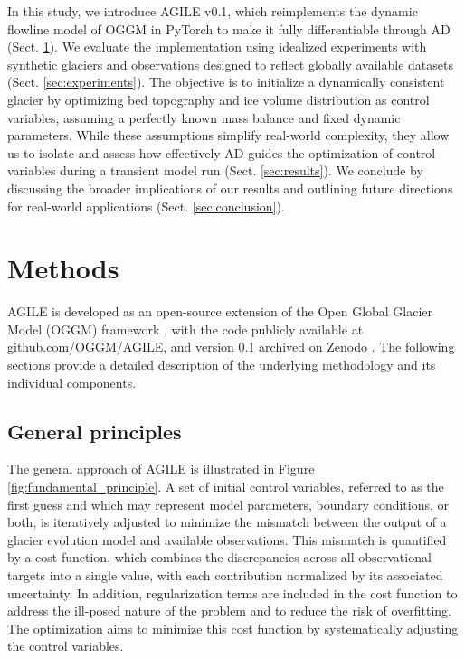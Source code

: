 \documentclass[journal abbreviation, manuscript]{copernicus}
\begin{document}
In this study, we introduce AGILE v0.1, which reimplements the dynamic flowline model of OGGM in PyTorch to make it fully differentiable through AD (Sect. \ref{sec:methods}). We evaluate the implementation using idealized experiments with synthetic glaciers and observations designed to reflect globally available datasets (Sect. \ref{sec:experiments}). The objective is to initialize a dynamically consistent glacier by optimizing bed topography and ice volume distribution as control variables, assuming a perfectly known mass balance and fixed dynamic parameters. While these assumptions simplify real-world complexity, they allow us to isolate and assess how effectively AD guides the optimization of control variables during a transient model run (Sect. \ref{sec:results}). We conclude by discussing the broader implications of our results and outlining future directions for real-world applications (Sect. \ref{sec:conclusion}).


\section{Methods}
\label{sec:methods}

AGILE is developed as an open-source extension of the Open Global Glacier Model (OGGM) framework \citep{Maussion2019}, with the code publicly available at \href{https://github.com/OGGM/AGILE}{github.com/OGGM/AGILE}, and version 0.1 archived on Zenodo \citep{AGILEv0.1}. The following sections provide a detailed description of the underlying methodology and its individual components.


\subsection{General principles}
\label{sec:general_principles}

The general approach of AGILE is illustrated in Figure \ref{fig:fundamental_principle}. A set of initial control variables, referred to as the first guess and which may represent model parameters, boundary conditions, or both, is iteratively adjusted to minimize the mismatch between the output of a glacier evolution model and available observations. This mismatch is quantified by a cost function, which combines the discrepancies across all observational targets into a single value, with each contribution normalized by its associated uncertainty. In addition, regularization terms are included in the cost function to address the ill-posed nature of the problem and to reduce the risk of overfitting. The optimization aims to minimize this cost function by systematically adjusting the control variables.
\end{document}
